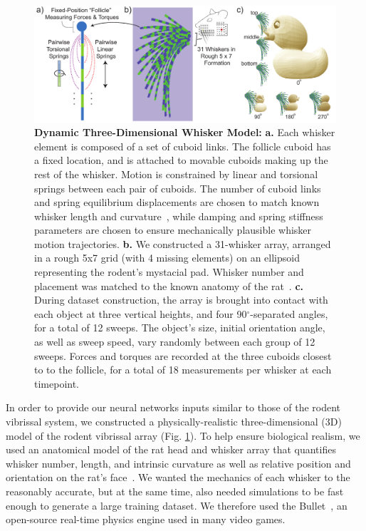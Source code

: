 \begin{figure}
\FigCenter
\includegraphics [width=\DefaultFigSize\linewidth]{figures/whiskers.pdf}
\vspace{-3mm}
\caption{\footnotesize{\textbf{Dynamic Three-Dimensional Whisker Model:} \textbf{a.} Each whisker element is composed of a set of cuboid links. 
The follicle cuboid has a fixed location, and is attached to movable cuboids making up the rest of the whisker. 
Motion is constrained by linear and torsional springs between each pair of cuboids. 
The number of cuboid links and spring equilibrium displacements are chosen to match known whisker length and curvature~\cite{Towal2011}, while damping and spring stiffness parameters are chosen to ensure mechanically plausible whisker motion trajectories.  
\textbf{b.} We constructed a 31-whisker array, arranged in a rough 5x7 grid (with 4 missing elements) on an ellipsoid representing the rodent's mystacial pad.  Whisker number and placement was matched to the known anatomy of the rat~\cite{Towal2011}.
\textbf{c.} During dataset construction, the array is brought into contact with each object at three vertical heights, and four 90$^{\circ}$-separated angles, for a total of 12 sweeps.  
The object's size, initial orientation angle, as well as sweep speed, vary randomly between each group of 12 sweeps. 
Forces and torques are recorded at the three cuboids closest to to the follicle, for a total of 18 measurements per whisker at each timepoint.}~\label{fig_whiskers}}
\vspace{-6mm}
\end{figure}

In order to provide our neural networks inputs similar to those of the rodent vibrissal system, we constructed a physically-realistic three-dimensional (3D) model of the rodent vibrissal array (Fig. \ref{fig_whiskers}).  
To help ensure biological realism, we used an anatomical model of the rat head and whisker array that quantifies whisker number, length, and intrinsic curvature as well as relative position and orientation on the rat's face~\cite{Towal2011}.
We wanted the mechanics of each whisker to the reasonably accurate, but at the same time, also needed simulations to be fast enough to generate a large training dataset.   
We therefore used the Bullet~\cite{wiki:bullet}, an open-source real-time physics engine used in many video games. 

